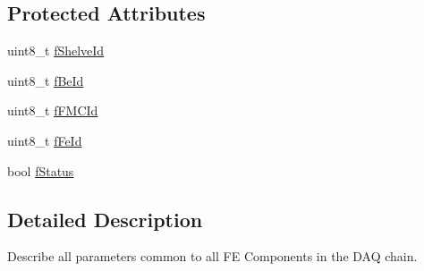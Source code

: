 \subsection*{Protected Attributes}
\begin{DoxyCompactItemize}
\item 
uint8\-\_\-t \hyperlink{class_ph2___hw_description_1_1_front_end_description_a7ce5e0acdcb5647bb94f09ec480e8155}{f\-Shelve\-Id}
\item 
uint8\-\_\-t \hyperlink{class_ph2___hw_description_1_1_front_end_description_a9ad4c11d4b00f0e1325843cfceac2e7c}{f\-Be\-Id}
\item 
uint8\-\_\-t \hyperlink{class_ph2___hw_description_1_1_front_end_description_a4f17ee7ee9d0d395c9f7da5ab3c8f424}{f\-F\-M\-C\-Id}
\item 
uint8\-\_\-t \hyperlink{class_ph2___hw_description_1_1_front_end_description_a11b388f8d0f3259e5355779b36e75d9f}{f\-Fe\-Id}
\item 
bool \hyperlink{class_ph2___hw_description_1_1_front_end_description_a719dce1ef5c6656fd71ae91f6f404053}{f\-Status}
\end{DoxyCompactItemize}


\subsection{Detailed Description}
Describe all parameters common to all F\-E Components in the D\-A\-Q chain. 


